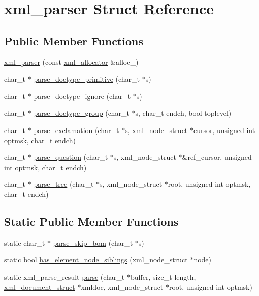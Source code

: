 \hypertarget{structxml__parser}{
\section{xml\_\-parser Struct Reference}
\label{structxml__parser}
}
\subsection*{Public Member Functions}
\begin{CompactItemize}
\item 
\hyperlink{structxml__parser_cc030c4ed339b238e1ff2d3e6fa7188b}{xml\_\-parser} (const \hyperlink{structxml__allocator}{xml\_\-allocator} \&alloc\_\-)
\item 
char\_\-t $\ast$ \hyperlink{structxml__parser_722853b603ad9a1d1f61bb8115bea5b4}{parse\_\-doctype\_\-primitive} (char\_\-t $\ast$s)
\item 
char\_\-t $\ast$ \hyperlink{structxml__parser_1e996ac9c9993f1939128859596376a1}{parse\_\-doctype\_\-ignore} (char\_\-t $\ast$s)
\item 
char\_\-t $\ast$ \hyperlink{structxml__parser_9bc0e5f3d75cd7edb267a85430e1cdfc}{parse\_\-doctype\_\-group} (char\_\-t $\ast$s, char\_\-t endch, bool toplevel)
\item 
char\_\-t $\ast$ \hyperlink{structxml__parser_40da52e4b27a0a06752930a0edf16fe9}{parse\_\-exclamation} (char\_\-t $\ast$s, xml\_\-node\_\-struct $\ast$cursor, unsigned int optmsk, char\_\-t endch)
\item 
char\_\-t $\ast$ \hyperlink{structxml__parser_2b0edc4fbf2ff448b4d5b31593c5c4fd}{parse\_\-question} (char\_\-t $\ast$s, xml\_\-node\_\-struct $\ast$\&ref\_\-cursor, unsigned int optmsk, char\_\-t endch)
\item 
char\_\-t $\ast$ \hyperlink{structxml__parser_96e76ebea8834b3e56e1c8646e593da4}{parse\_\-tree} (char\_\-t $\ast$s, xml\_\-node\_\-struct $\ast$root, unsigned int optmsk, char\_\-t endch)
\end{CompactItemize}
\subsection*{Static Public Member Functions}
\begin{CompactItemize}
\item 
static char\_\-t $\ast$ \hyperlink{structxml__parser_f0a3f5a488b05da9fa2c87e1dd1f9eda}{parse\_\-skip\_\-bom} (char\_\-t $\ast$s)
\item 
static bool \hyperlink{structxml__parser_6be4da5b3206913d0e3bd8320394df41}{has\_\-element\_\-node\_\-siblings} (xml\_\-node\_\-struct $\ast$node)
\item 
static xml\_\-parse\_\-result \hyperlink{structxml__parser_4bf0acd166edf3fc6cc9543002ff6f5d}{parse} (char\_\-t $\ast$buffer, size\_\-t length, \hyperlink{structxml__document__struct}{xml\_\-document\_\-struct} $\ast$xmldoc, xml\_\-node\_\-struct $\ast$root, unsigned int optmsk)
\end{CompactItemize}
